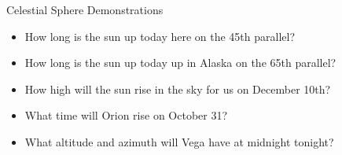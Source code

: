 \documentclass[pdf, aspectratio=169]{beamer}
\begin{document}
\begin{frame}{Celestial Sphere Demonstrations}
  \begin{example}
	\begin{itemize}
	  \item How long is the sun up today here on the 45th parallel?
	  \item How long is the sun up today up in Alaska on the 65th parallel?
	  \item How high will the sun rise in the sky for us on December 10th?
	  \item What time will Orion rise on October 31?
	  \item What altitude and azimuth will Vega have at midnight tonight?
	\end{itemize}
  \end{example}
\end{frame}
\end{document}

